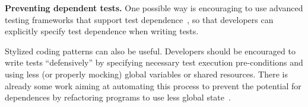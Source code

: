 




\vspace{1mm}


\noindent \textbf{{Preventing dependent tests.}}
One possible way is encouraging to
use advanced testing frameworks that support test dependence~\cite{testng},
so that developers can explicitly specify test
dependence when writing tests.

Stylized coding patterns can also be useful. Developers
should be encouraged to write tests ``defensively'' by
specifying necessary test execution pre-conditions and
using less (or properly mocking) global variables or shared resources. 
There is already some work aiming at automating this
process to prevent the potential
for dependences by refactoring programs to use
less global state~\cite{wlokaetal:FSE:2009}. 



